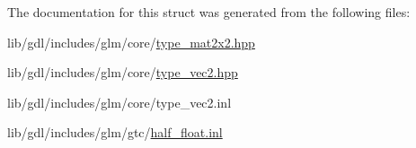 The documentation for this struct was generated from the following files\+:\begin{DoxyCompactItemize}
\item 
lib/gdl/includes/glm/core/\hyperlink{type__mat2x2_8hpp}{type\+\_\+mat2x2.\+hpp}\item 
lib/gdl/includes/glm/core/\hyperlink{type__vec2_8hpp}{type\+\_\+vec2.\+hpp}\item 
lib/gdl/includes/glm/core/type\+\_\+vec2.\+inl\item 
lib/gdl/includes/glm/gtc/\hyperlink{half__float_8inl}{half\+\_\+float.\+inl}\end{DoxyCompactItemize}
